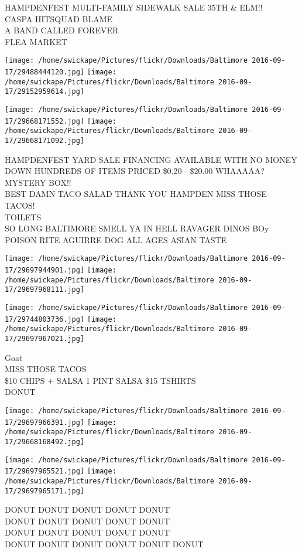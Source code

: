 \documentclass[10pt,letterpaper]{article}
\begin{document}
HAMPDENFEST MULTI{-}FAMILY SIDEWALK SALE 35TH \& ELM!!\\
CASPA HITSQUAD BLAME\\
A BAND CALLED FOREVER\\
FLEA MARKET
\pagebreak

\texttt{[image: /home/swickape/Pictures/flickr/Downloads/Baltimore 2016-09-17/29488444120.jpg]}
\texttt{[image: /home/swickape/Pictures/flickr/Downloads/Baltimore 2016-09-17/29152959614.jpg]}

\texttt{[image: /home/swickape/Pictures/flickr/Downloads/Baltimore 2016-09-17/29668171552.jpg]}
\texttt{[image: /home/swickape/Pictures/flickr/Downloads/Baltimore 2016-09-17/29668171092.jpg]}

HAMPDENFEST YARD SALE FINANCING AVAILABLE WITH NO MONEY DOWN HUNDREDS OF ITEMS PRICED \$0.20 {-} \$20.00 WHAAAAA?  MYSTERY BOX!!\\
BEST DAMN TACO SALAD THANK YOU HAMPDEN MISS THOSE TACOS!\\
TOILETS\\
SO LONG BALTIMORE SMELL YA IN HELL RAVAGER DINOS BOy POISON RITE AGUIRRE DOG ALL AGES ASIAN TASTE
\pagebreak

\texttt{[image: /home/swickape/Pictures/flickr/Downloads/Baltimore 2016-09-17/29697944901.jpg]}
\texttt{[image: /home/swickape/Pictures/flickr/Downloads/Baltimore 2016-09-17/29697968111.jpg]}

\texttt{[image: /home/swickape/Pictures/flickr/Downloads/Baltimore 2016-09-17/29744803736.jpg]}
\texttt{[image: /home/swickape/Pictures/flickr/Downloads/Baltimore 2016-09-17/29697967021.jpg]}

Goat\\
MISS THOSE TACOS\\
\$10 CHIPS + SALSA 1 PINT SALSA \$15 TSHIRTS\\
DONUT
\pagebreak

\texttt{[image: /home/swickape/Pictures/flickr/Downloads/Baltimore 2016-09-17/29697966391.jpg]}
\texttt{[image: /home/swickape/Pictures/flickr/Downloads/Baltimore 2016-09-17/29668168492.jpg]}

\texttt{[image: /home/swickape/Pictures/flickr/Downloads/Baltimore 2016-09-17/29697965521.jpg]}
\texttt{[image: /home/swickape/Pictures/flickr/Downloads/Baltimore 2016-09-17/29697965171.jpg]}

DONUT DONUT DONUT DONUT DONUT\\
DONUT DONUT DONUT DONUT DONUT\\
DONUT DONUT DONUT DONUT DONUT\\
DONUT DONUT DONUT DONUT DONUT DONUT
\pagebreak
\end{document}
